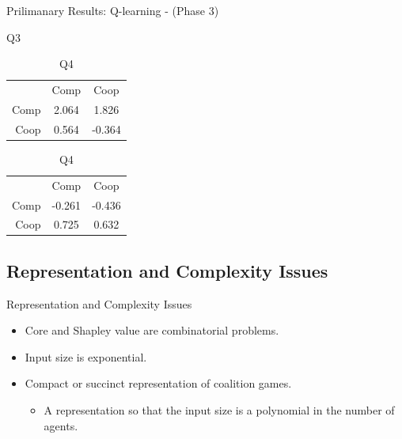 \documentclass{beamer}
\begin{document}
\begin{frame}{Prilimanary Results: Q-learning - (Phase 3)}
    \begin{table}[!htb]
        \begin{minipage}{.5\linewidth}
          \caption{Q3}
          \centering
            \begin{tabular}{ r|c|c| }
                \multicolumn{1}{r}{}
                 &  \multicolumn{1}{c}{Comp}
                 & \multicolumn{1}{c}{Coop} \\
                \cline{2-3}
                Comp & 2.064 & 1.826 \\
                \cline{2-3}
                Coop & 0.564 & -0.364 \\
                \cline{2-3}
            \end{tabular}
        \end{minipage}%
        \begin{minipage}{.5\linewidth}
          \centering
            \caption{Q4}
            \begin{tabular}{ r|c|c| }
                \multicolumn{1}{r}{}
                 &  \multicolumn{1}{c}{Comp}
                 & \multicolumn{1}{c}{Coop} \\
                \cline{2-3}
                Comp & -0.261 & -0.436 \\
                \cline{2-3}
                Coop & 0.725 & 0.632 \\
                \cline{2-3}
            \end{tabular}
        \end{minipage}
    \end{table}

\end{frame}

\subsection{Representation and Complexity Issues}
\begin{frame}{Representation and Complexity Issues}
    \begin{itemize}
        \item Core and Shapley value are combinatorial problems.
        \item Input size is exponential.
        \item Compact or succinct representation of coalition games.
        \begin{itemize}
            \item A representation so that the input size is a polynomial in the number of agents.
        \end{itemize}
    \end{itemize}
\end{frame}
\end{document}
